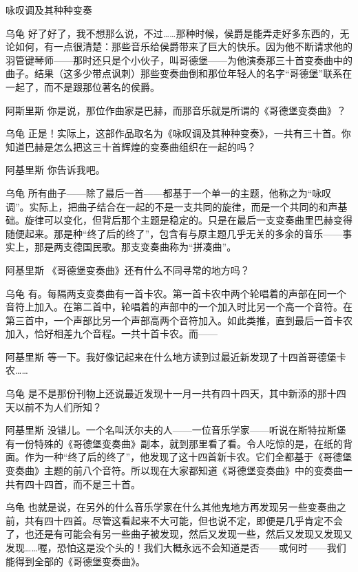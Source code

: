 \begin{dialog}{咏叹调及其种种变奏}
\begin{dialogue}
\item[乌龟]好了好了，我不想那么说，不过……那种时候，侯爵是能弄走好多东西的，无论如何，有一点很清楚：那些音乐给侯爵带来了巨大的快乐。因为他不断请求他的羽管键琴师——那时还只是个小伙子，叫哥德堡——为他演奏那三十首变奏曲中的曲子。结果（这多少带点讽刺）那些变奏曲倒和那位年轻人的名字“哥德堡”联系在一起了，而不是跟那位著名的侯爵。

\item[阿斯里斯]你是说，那位作曲家是巴赫，而那音乐就是所谓的《哥德堡变奏曲》？

\item[乌龟]正是！实际上，这部作品取名为《咏叹调及其种种变奏》，一共有三十首。你知道巴赫是怎么把这三十首辉煌的变奏曲组织在一起的吗？

\item[阿基里斯]你告诉我吧。

\item[乌龟]所有曲子——除了最后一首——都基于一个单一的主题，他称之为“咏叹调”。实际上，把曲子结合在一起的不是一支共同的旋律，而是一个共同的和声基础。旋律可以变化，但背后那个主题是稳定的。只是在最后一支变奏曲里巴赫变得随便起来。那是种“终了后的终了”，包含有与原主题几乎无关的多余的音乐——事实上，那是两支德国民歌。那支变奏曲称为“拼凑曲”。

\item[阿基里斯]《哥德堡变奏曲》还有什么不同寻常的地方吗？

\item[乌龟]有。每隔两支变奏曲有一首卡农。第一首卡农中两个轮唱着的声部在同一个音符上加入。在第二首中，轮唱着的声部中的一个加入时比另一个高一个音符。在第三首中，一个声部比另一个声部高两个音符加入。如此类推，直到最后一首卡农加入，恰好相差九个音程。一共十首卡农。而——

\item[阿基里斯]等一下。我好像记起来在什么地方读到过最近新发现了十四首哥德堡卡农……

\item[乌龟]是不是那份刊物上还说最近发现十一月一共有四十四天，其中新添的那十四天以前不为人们所知？

\item[阿基里斯]没错儿。一个名叫沃尔夫的人——一位音乐学家——听说在斯特拉斯堡有一份特殊的《哥德堡变奏曲》副本，就到那里看了看。令人吃惊的是，在纸的背面。作为一种“终了后的终了”，他发现了这十四首新卡农。它们全都基于《哥德堡变奏曲》主题的前八个音符。所以现在大家都知道《哥德堡变奏曲》中的变奏曲一共有四十四首，而不是三十首。

\item[乌龟]也就是说，在另外的什么音乐学家在什么其他鬼地方再发现另一些变奏曲之前，共有四十四首。尽管这看起来不大可能，但也说不定，即便是几乎肯定不会了，也还是有可能会有另一些曲子被发现，然后又发现一些，然后又发现又发现又发现……喔，恐怕这是没个头的！我们大概永远不会知道是否——或何时——我们能得到全部的《哥德堡变奏曲》。


\end{dialogue}
\end{dialog}
